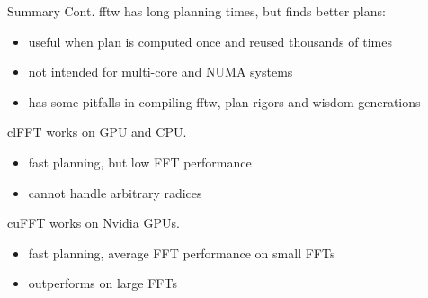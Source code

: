 \documentclass[t,11pt,hyperref={
  pdftitle = {gearshifft},
  pdfsubject = {gearshifft},
  pdfborder={0 0 0},
  colorlinks=true,
  urlcolor=red,
  citecolor=red,
  linkcolor=red,
  pdfauthor={Peter Steinbach, Matthias Werner}
  }
]{beamer}
\begin{document}
\begin{frame}{Summary Cont.}{}
  fftw has long planning times, but finds better plans:
  \begin{itemize}
  \item useful when plan is computed once and reused thousands of times
  \item not intended for multi-core and NUMA systems
  \item has some pitfalls in compiling fftw, plan-rigors and wisdom generations
  \end{itemize}

  clFFT works on GPU and CPU.
  \begin{itemize}
  \item fast planning, but low FFT performance
  \item cannot handle arbitrary radices
  \end{itemize}

  cuFFT works on Nvidia GPUs.
  \begin{itemize}
  \item fast planning, average FFT performance on small FFTs
  \item outperforms on large FFTs
  \end{itemize}
  
\end{frame}
\end{document}
